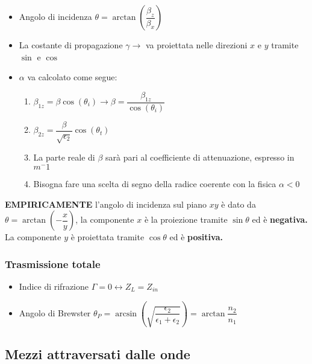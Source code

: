\documentclass{article}
\begin{document}
\begin{itemize}
	\item Angolo di incidenza \( \theta = \arctan\left( \dfrac{\beta_z}{\beta_x} \right) \)
	\item La costante di propagazione \(\gamma \rightarrow\) va proiettata nelle direzioni \(x\) e \(y\) tramite \(\sin\) e \(\cos\)
	\item \(\alpha\) va calcolato come segue:
	\begin{enumerate}
		\item \(\beta_{1z} = \beta \cos(\theta_i) \rightarrow \beta = \dfrac{\beta_{1z}}{\cos(\theta_i)} \)
		\item \( \beta_{2z} = \dfrac{\beta}{\sqrt{\epsilon_2}} \cos(\theta_t) \)
		\item La parte reale di \(\beta\) sarà pari al coefficiente di attenuazione, espresso in \(m^-1\)
		\item Bisogna fare una scelta di segno della radice coerente con la fisica \( \alpha < 0 \)
	\end{enumerate}
\end{itemize}

\textbf{EMPIRICAMENTE} l'angolo di incidenza sul piano \(xy\) è dato da \(\theta = \arctan \left( - \dfrac{x}{y} \right) \), la componente \(x\) è la proiezione tramite \(\sin\theta\) ed è \textbf{negativa.} La componente \(y\) è proiettata tramite \(\cos\theta\) ed è \textbf{positiva.}

\subsubsection{Trasmissione totale}
\begin{itemize}
	\item Indice di rifrazione \( \Gamma = 0 \leftrightarrow Z_L = Z_{in} \)
	\item Angolo di Brewster \( \theta_P = \arcsin\left(\sqrt{\dfrac{\epsilon_2}{\epsilon_1 + \epsilon_2}}\right) = \arctan\dfrac{n_2}{n_1}\)
\end{itemize}

\subsection{Mezzi attraversati dalle onde}
\end{document}
